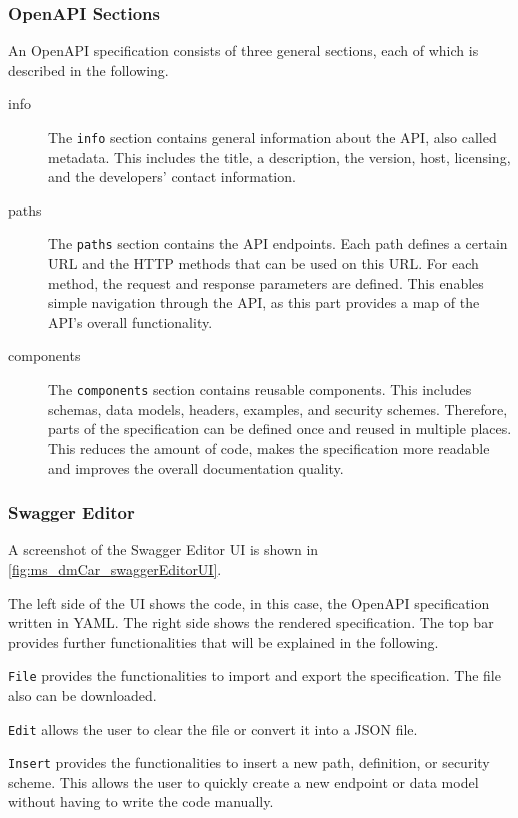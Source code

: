 \subsubsection*{OpenAPI Sections}
An OpenAPI specification consists of three general sections, each of which is described in the following.
\begin{description}
    \item[info] The \texttt{info} section contains general information about the API, also called metadata.
                This includes the title, a description, the version, host, licensing, and the developers' contact information.
    \item[paths] The \texttt{paths} section contains the API endpoints.
                Each path defines a certain URL and the HTTP methods that can be used on this URL.
                For each method, the request and response parameters are defined.
                This enables simple navigation through the API, as this part provides a map of the API's overall functionality.
    \item[components] The \texttt{components} section contains reusable components.
                This includes schemas, data models, headers, examples, and security schemes.
                Therefore, parts of the specification can be defined once and reused in multiple places.
                This reduces the amount of code, makes the specification more readable and improves the overall documentation quality.
\end{description}

\subsubsection*{Swagger Editor}
A screenshot of the Swagger Editor UI is shown in \autoref{fig:ms_dmCar_swaggerEditorUI}.

The left side of the UI shows the code, in this case, the OpenAPI specification written in YAML.
The right side shows the rendered specification.
The top bar provides further functionalities that will be explained in the following.

\texttt{File} provides the functionalities to import and export the specification.
The file also can be downloaded.

\texttt{Edit} allows the user to clear the file or convert it into a JSON file.

\texttt{Insert} provides the functionalities to insert a new path, definition, or security scheme.
This allows the user to quickly create a new endpoint or data model without having to write the code manually.

